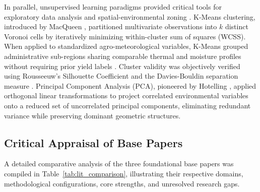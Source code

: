 \documentclass[conference]{IEEEtran}
\begin{document}
In parallel, unsupervised learning paradigms provided critical tools for exploratory data analysis and spatial-environmental zoning \cite{macqueen1967, hotelling1933}. K-Means clustering, introduced by MacQueen \cite{macqueen1967}, partitioned multivariate observations into $k$ distinct Voronoi cells by iteratively minimizing within-cluster sum of squares (WCSS). When applied to standardized agro-meteorological variables, K-Means grouped administrative sub-regions sharing comparable thermal and moisture profiles without requiring prior yield labels \cite{macqueen1967}. Cluster validity was objectively verified using Rousseeuw's Silhouette Coefficient \cite{rousseeuw1987} and the Davies-Bouldin separation measure \cite{davies1979}. Principal Component Analysis (PCA), pioneered by Hotelling \cite{hotelling1933}, applied orthogonal linear transformations to project correlated environmental variables onto a reduced set of uncorrelated principal components, eliminating redundant variance while preserving dominant geometric structures.

\subsection{Critical Appraisal of Base Papers}
A detailed comparative analysis of the three foundational base papers \cite{dhakal2023, crane2018, fernandez2021} was compiled in Table~\ref{tab:lit_comparison}, illustrating their respective domains, methodological configurations, core strengths, and unresolved research gaps.
\end{document}
